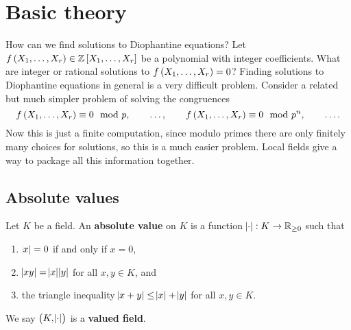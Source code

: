 \def\module{Local Fields}
\def\lecturer{Dr Rong Zhou}
\def\term{Michaelmas 2020}
\def\cover{}
\def\syllabus{}
\def\thm{subsection}



\newcommand{\pp}{\mathfrak{P}}





\setcounter{section}{0}

\section{Basic theory}


How can we find solutions to Diophantine equations? Let $ f\br{X_1, \dots, X_r} \in \ZZ\sbr{X_1, \dots, X_r} $ be a polynomial with integer coefficients. What are integer or rational solutions to $ f\br{X_1, \dots, X_r} = 0 $? Finding solutions to Diophantine equations in general is a very difficult problem. Consider a related but much simpler problem of solving the congruences
$$ f\br{X_1, \dots, X_r} \equiv 0 \mod p, \qquad \dots, \qquad f\br{X_1, \dots, X_r} \equiv 0 \mod p^n, \qquad \dots. $$
Now this is just a finite computation, since modulo primes there are only finitely many choices for solutions, so this is a much easier problem. Local fields give a way to package all this information together.

\subsection{Absolute values}

\begin{definition}
Let $ K $ be a field. An \textbf{absolute value} on $ K $ is a function $ \abs{\cdot} : K \to \mathbb{R}_{\ge 0} $ such that
\begin{enumerate}
\item $ \abs{x} = 0 $ if and only if $ x = 0 $,
\item $ \abs{xy} = \abs{x}\abs{y} $ for all $ x, y \in K $, and
\item the triangle inequality $ \abs{x + y} \le \abs{x} + \abs{y} $ for all $ x, y \in K $.
\end{enumerate}
We say $ \br{K, \abs{\cdot}} $ is a \textbf{valued field}.
\end{definition}

